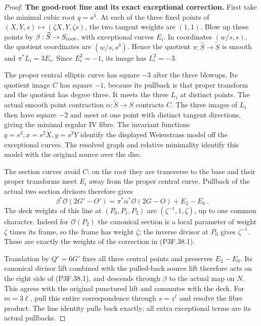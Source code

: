 \begin{proof}
\par\medskip\noindent\textbf{The good-root line and its exact exceptional correction.}
First take the minimal cubic root \(q=s^3\). At each of the
three fixed points of
\((X,Y,s)\mapsto(\zeta X,Y,\zeta s)\), the two tangent
weights are \((1,1)\). Blow up these points by
\(\beta:\widehat S\to S_{\rm root}\), with exceptional
curves \(E_i\). In coordinates \((w/s,s)\), the quotient
coordinates are \((w/s,s^3)\). Hence the quotient
\(\pi:\widehat S\to\widetilde S\) is smooth and
\(\pi^*L_i=3E_i\). Since \(E_i^2=-1\), its image has
\(L_i^2=-3\).

The proper central elliptic curve has square \(-3\) after the
three blowups. Its quotient image \(C\) has square \(-1\),
because its pullback is that proper transform and the quotient
has degree three. It meets the three \(L_i\) at distinct points.
The actual smooth point contraction
\(\alpha:\widetilde S\to S\) contracts \(C\). The three
images of \(L_i\) then have square \(-2\) and meet at one
point with distinct tangent directions, giving the minimal regular
IV fibre. The invariant functions
\(q=s^3,x=s^2X,y=s^3Y\) identify the displayed Weierstrass
model off the exceptional curves. The resolved graph and relative
minimality identify this model with the original source over the
disc.

The section curves avoid \(C\): on the root they are transverse
to the base and their proper transforms meet \(E_i\) away from
the proper central curve. Pullback of the actual two section
divisors therefore gives
\[
 \boxed{\ \beta^*\mathcal O(2G'-O')
       =\pi^*\alpha^*\mathcal O(2G-O)+E_2-E_0\ }.             \tag{P3F.38.1}
\]
The deck weights of this line at \((P_0,P_1,P_2)\) are
\((\zeta^{-1},1,\zeta)\), up to one common character. Indeed
for \(\mathcal O(P_2)\) the canonical section is a local
parameter of weight \(\zeta\) times its frame, so the frame
has weight \(\zeta\); the inverse divisor at \(P_0\) gives
\(\zeta^{-1}\). These are exactly the weights of the
correction in (P3F.38.1).

Translation by \(Q'=6G'\) fixes all three central points and
preserves \(E_2-E_0\). Its canonical divisor lift combined with
the pulled-back source lift therefore acts on the right side of
(P3F.38.1), and descends through \(\beta\) to the actual map
on \(N\). This agrees with the original punctured lift and
commutes with the deck. For \(m=3\ell\), pull this entire
correspondence through \(s=z^\ell\) and resolve the fibre
product. The line identity pulls back exactly; all extra
exceptional terms are its actual pullbacks.


\end{proof}
